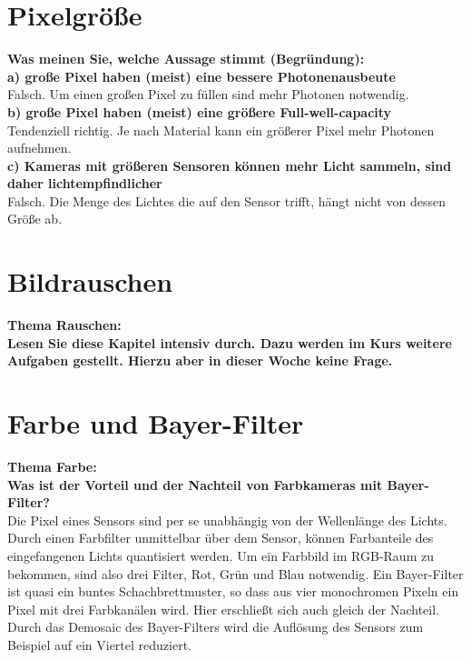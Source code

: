 \documentclass[a4paper]{article}
\begin{document}
	\newpage
	
	\section{Pixelgröße}
	\textbf{Was meinen Sie, welche Aussage stimmt (Begründung):}\\
	\textbf{a) große Pixel haben (meist) eine bessere Photonenausbeute}\\
	Falsch. Um einen großen Pixel zu füllen sind mehr Photonen notwendig.\\
	\textbf{b) große Pixel haben (meist) eine größere Full-well-capacity}\\
	Tendenziell richtig. Je nach Material kann ein größerer Pixel mehr Photonen aufnehmen.\\
	\textbf{c) Kameras mit größeren Sensoren können mehr Licht sammeln, sind daher
	lichtempfindlicher}\\
	Falsch. Die Menge des Lichtes die auf den Sensor trifft, hängt nicht von dessen Größe ab. 
	
	\section{Bildrauschen}
	\textbf{Thema Rauschen:}\\
	\textbf{Lesen Sie diese Kapitel intensiv durch. Dazu werden im Kurs weitere Aufgaben gestellt.
	Hierzu aber in dieser Woche keine Frage.}
	
	\section{Farbe und Bayer-Filter}
	\textbf{Thema Farbe:}\\
	\textbf{Was ist der Vorteil und der Nachteil von Farbkameras mit Bayer-Filter?}\\
	Die Pixel eines Sensors sind per se unabhängig von der Wellenlänge des Lichts. Durch einen Farbfilter unmittelbar über dem Sensor, können Farbanteile des eingefangenen Lichts quantisiert werden. Um ein Farbbild im RGB-Raum zu bekommen, sind also drei Filter, Rot, Grün und Blau notwendig. Ein Bayer-Filter ist quasi ein buntes Schachbrettmuster, so dass aus vier monochromen Pixeln ein Pixel mit drei Farbkanälen wird. Hier erschließt sich auch gleich der Nachteil. Durch das Demosaic des Bayer-Filters wird die Auflösung des Sensors zum Beispiel auf ein Viertel reduziert.
	
\end{document}
